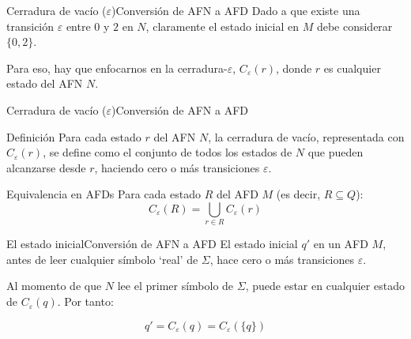 \documentclass[spanish]{beamer}
\begin{document}
  \begin{frame}{Cerradura de vacío ($\varepsilon$)}{Conversión de AFN a AFD}
    Dado a que existe una transición $\varepsilon$ entre $0$ y $2$ en $N$, claramente el estado inicial en $M$ debe considerar $\{0,2\}$.

    \begin{center}
    \end{center} \pause

    Para eso, hay que enfocarnos en la cerradura-$\varepsilon$, $C_\varepsilon (r)$, donde $r$ es cualquier estado del AFN $N$.      
  \end{frame}

  \begin{frame}{Cerradura de vacío ($\varepsilon$)}{Conversión de AFN a AFD}

    \begin{block}{Definición}
        Para cada estado $r$ del AFN $N$, la \alert{cerradura de vacío}, representada con $C_\varepsilon (r)$, se define como el conjunto de todos los estados de $N$ que pueden alcanzarse desde $r$, haciendo cero o más transiciones $\varepsilon$.
    \end{block} \pause

    \bigskip

    \begin{exampleblock}{Equivalencia en AFDs}
        Para cada estado $R$ del AFD $M$ (es decir, $R \subseteq Q$):
        \[C_\varepsilon (R) = \bigcup_{r \in R} C_\varepsilon (r)\]
    \end{exampleblock}

  \end{frame}

  \begin{frame}{El estado inicial}{Conversión de AFN a AFD}
      El \alert{estado inicial} $q'$ en un AFD $M$, antes de leer cualquier símbolo `real' de $\Sigma$, hace cero o más transiciones $\varepsilon$. \pause

      \bigskip

      Al momento de que $N$ lee el primer símbolo de $\Sigma$, puede estar en cualquier estado de $C_\varepsilon(q)$. Por tanto:

      \[q' = C_\varepsilon (q) = C_\varepsilon(\{q\})\]
  \end{frame}
\end{document}
